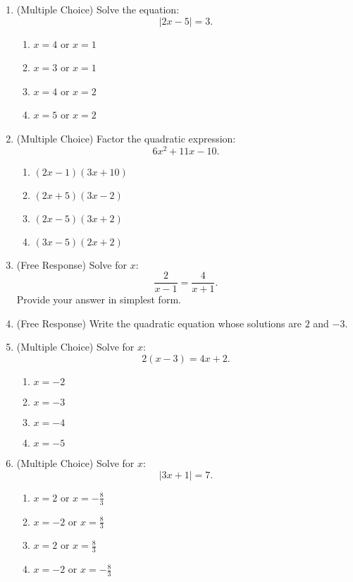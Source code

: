 \documentclass[12pt]{article}
\begin{document}
\begin{enumerate}[label=\textbf{Question \arabic*:}]
  \item (Multiple Choice) Solve the equation:
    \[
    |2x - 5| = 3.
    \]
    \begin{enumerate}[label=(\Alph*)]
      \item \(x = 4\) or \(x = 1\)
      \item \(x = 3\) or \(x = 1\)
      \item \(x = 4\) or \(x = 2\)
      \item \(x = 5\) or \(x = 2\)
    \end{enumerate}
    
  \item (Multiple Choice) Factor the quadratic expression:
    \[
    6x^2 + 11x - 10.
    \]
    \begin{enumerate}[label=(\Alph*)]
      \item \((2x - 1)(3x + 10)\)
      \item \((2x + 5)(3x - 2)\)
      \item \((2x - 5)(3x + 2)\)
      \item \((3x - 5)(2x + 2)\)
    \end{enumerate}
    
  \item (Free Response) Solve for \(x\):
    \[
    \frac{2}{x-1} = \frac{4}{x+1}.
    \]
    Provide your answer in simplest form.
    
  \item (Free Response) Write the quadratic equation whose solutions are \(2\) and \(-3\).

  \item (Multiple Choice) Solve for \(x\):
    \[
    2(x-3) = 4x + 2.
    \]
    \begin{enumerate}[label=(\Alph*)]
      \item \(x = -2\)
      \item \(x = -3\)
      \item \(x = -4\)
      \item \(x = -5\)
    \end{enumerate}
    
  \item (Multiple Choice) Solve for \(x\):
    \[
    |3x + 1| = 7.
    \]
    \begin{enumerate}[label=(\Alph*)]
      \item \(x = 2\) or \(x = -\frac{8}{3}\)
      \item \(x = -2\) or \(x = \frac{8}{3}\)
      \item \(x = 2\) or \(x = \frac{8}{3}\)
      \item \(x = -2\) or \(x = -\frac{8}{3}\)
    \end{enumerate}
    

\end{enumerate}
\end{document}
